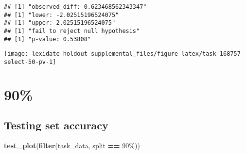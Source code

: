 \documentclass[
]{book}
\newenvironment{Shaded}{\begin{snugshade}}{\end{snugshade}}
\newcommand{\AttributeTok}[1]{\textcolor[rgb]{0.13,0.29,0.53}{#1}}
\newcommand{\DecValTok}[1]{\textcolor[rgb]{0.00,0.00,0.81}{#1}}
\newcommand{\FunctionTok}[1]{\textcolor[rgb]{0.13,0.29,0.53}{\textbf{#1}}}
\newcommand{\NormalTok}[1]{#1}
\newcommand{\OtherTok}[1]{\textcolor[rgb]{0.56,0.35,0.01}{#1}}
\newcommand{\SpecialCharTok}[1]{\textcolor[rgb]{0.81,0.36,0.00}{\textbf{#1}}}
\newcommand{\StringTok}[1]{\textcolor[rgb]{0.31,0.60,0.02}{#1}}
\begin{document}
\begin{Shaded}
\end{Shaded}

\begin{verbatim}
## [1] "observed_diff: 0.623468562343347"
## [1] "lower: -2.02515196524075"
## [1] "upper: 2.02515196524075"
## [1] "fail to reject null hypothesis"
## [1] "p-value: 0.53808"
\end{verbatim}

\texttt{[image: lexidate-holdout-supplemental\_files/figure-latex/task-168757-select-50-pv-1]}

\hypertarget{section-23}{%
\section{90\%}\label{section-23}}

\hypertarget{testing-set-accuracy-23}{%
\subsection{Testing set accuracy}\label{testing-set-accuracy-23}}

\begin{Shaded}
\begin{Highlighting}[]
\FunctionTok{test\_plot}\NormalTok{(}\FunctionTok{filter}\NormalTok{(task\_data, split }\SpecialCharTok{==} \StringTok{\textquotesingle{}90\%\textquotesingle{}}\NormalTok{))}
\end{Highlighting}
\end{Shaded}
\end{document}

